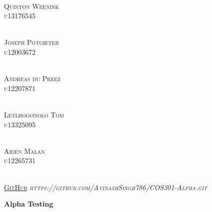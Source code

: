 \documentclass{article}
\begin{document}
\begin{titlepage}
\begin{center}
\begin{multicols}{2}
				\columnbreak
				
				\textsc{\large\\
					Quinton Weenink\\
					u13176545\\
				}
				
				\textsc{\large\\
					Joseph Potgieter\\
					u12003672\\
				}
				
				\textsc{\large\\
					Andreas du Preez\\
					u12207871\\
				}
				
				\textsc{\large\\
					Letlhogonolo Tom\\
					u13325095\\
				}
				
				\textsc{\large\\
					Aiden Malan\\
					u12265731\\
				}
				
			\end{multicols}
			
			
			\textsc{	\\ \href{https://github.com/AvinashSingh786/people_testing.git}{GitHub}
				\textit{https://github.com/AvinashSingh786/COS301-Alpha.git}}
			
		\end{center}
	\end{titlepage}
	
	\tableofcontents
	\thispagestyle{empty}
	\cleardoublepage
	
	\setcounter{page}{1}
	
	\vspace*{\fill}
	\begin{center}
		\Huge \textbf{Alpha Testing}
	\end{center}
	\vspace*{\fill}
	
\end{document}
